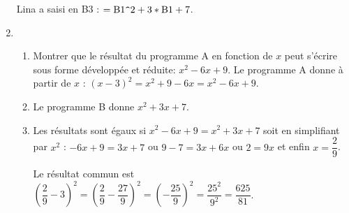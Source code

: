 \begin{enumerate}
Lina a saisi en B3 : $=\text{B}1\verb+^+2+3*\text{B}1+7$.
\item  %
	\begin{enumerate}
		\item Montrer que le résultat du programme A en fonction de $x$ peut s'écrire sous forme développée et réduite: $x^2 - 6x + 9$.
Le programme A donne à partir de $x$ : $(x - 3)^2 = x^2 + 9 - 6x = x^2 - 6x + 9$.
		\item %
				Le programme B donne $x^2 + 3x + 7$.
		\item %
		
Les résultats sont égaux si $x^2 - 6x + 9 = x^2 + 3x + 7$ soit en simplifiant par $x^2$ : $- 6x + 9 = 3x + 7$ ou $9 - 7 = 3x + 6x$ ou $2 = 9x$ et enfin $x = \dfrac{2}{9}$.

Le résultat commun est $\left(\dfrac{2}{9} - 3 \right)^2  = \left(\dfrac{2}{9} - \dfrac{27}{9} \right)^2 = \left(- \dfrac{25}{9}\right)^2 = \dfrac{25^2}{9^2} = \dfrac{625}{81}$.
	\end{enumerate} 
\end{enumerate}


